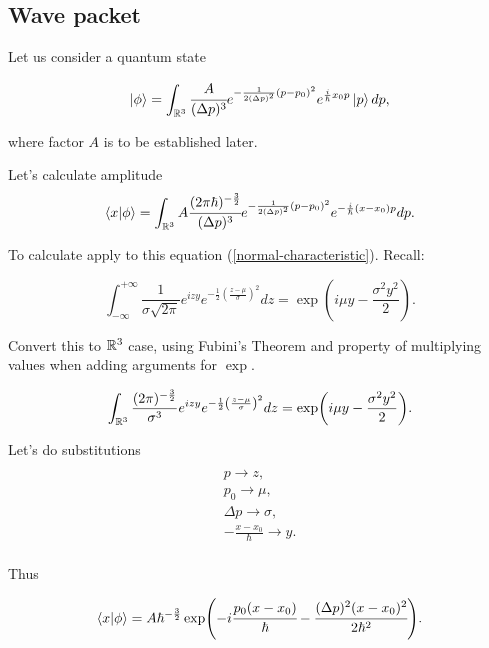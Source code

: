 \documentclass[main.tex]{subfiles}
\begin{document}
\subsection{Wave packet}

Let us consider a quantum state

\begin{equation}
\ket{\phi} = \int_{\mathbb{R}^3} \cfrac{A}{(\Delta p)^3} e^{-\frac{1}{2(\Delta p)^2}(p - p_0)^2} e^{\frac{i}{\hbar}x_0 p}\ket{p} dp,
\end{equation}

where factor $A$ is to be established later. 

Let's calculate amplitude 
\begin{equation}
\bra{x}\ket{\phi} = \int_{\mathbb{R}^3} A \cfrac{ (2\pi\hbar)^{-\frac{3}{2}}}{(\Delta p)^3} e^{-\frac{1}{2(\Delta p)^2}(p - p_0)^2} e^{-\frac{i}{\hbar}(x - x_0) p} dp.
\end{equation}


To calculate apply to this equation (\ref{normal-characteristic}). Recall:

\begin{equation}
\int^{+\infty}_{-\infty} \frac{1}{\sigma \sqrt{2\pi} } e^{izy} e^{-\frac{1}{2}\left(\frac{z-\mu}{\sigma}\right)^2}dz = \exp(i\mu y - \frac{\sigma^2 y^2}{2}).
\end{equation}

Convert this to $\mathbb{R}^3$ case, using Fubini's Theorem and property of multiplying values when adding arguments for $\exp$.

\begin{equation}
\int_{\mathbb{R}^3} \frac{(2\pi)^{-\frac{3}{2}}}{\sigma^3} e^{izy} e^{-\frac{1}{2}\left(\frac{z-\mu}{\sigma}\right)^2}dz = \exp(i\mu y - \frac{\sigma^2 y^2}{2}).
\end{equation}

Let's do substitutions
\begin{multline*}\\
p \to z,\\
p_0 \to \mu, \\
\Delta p \to \sigma, \\
-\frac{x - x_0}{\hbar} \to y.
\\
\end{multline*}

Thus

\begin{equation}
\bra{x}\ket{\phi} = A \hbar^{-\frac{3}{2}}
\exp(-i\cfrac{p_0(x - x_0)}{\hbar} - \cfrac{(\Delta p)^2(x - x_0)^2}{2\hbar^2}).
\end{equation}
\end{document}
